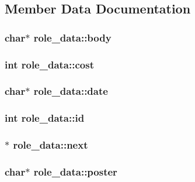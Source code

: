 \subsection{Member Data Documentation}
\hypertarget{structrole__data_a52171559fdafc63e0383f45bd0db9c30}{
\subsubsection[{body}]{\setlength{\rightskip}{0pt plus 5cm}char$\ast$ role\-\_\-data\-::body}}\label{structrole__data_a52171559fdafc63e0383f45bd0db9c30}
\hypertarget{structrole__data_a371b44ddb9a1fa4a8b8d158cc5beaf1e}{
\subsubsection[{cost}]{\setlength{\rightskip}{0pt plus 5cm}int role\-\_\-data\-::cost}}\label{structrole__data_a371b44ddb9a1fa4a8b8d158cc5beaf1e}
\hypertarget{structrole__data_ac2201dc10fb1e79789b5b0a012603b0f}{
\subsubsection[{date}]{\setlength{\rightskip}{0pt plus 5cm}char$\ast$ role\-\_\-data\-::date}}\label{structrole__data_ac2201dc10fb1e79789b5b0a012603b0f}
\hypertarget{structrole__data_a9d9be7e3de7e18725f2ae12f3a9f4b07}{
\subsubsection[{id}]{\setlength{\rightskip}{0pt plus 5cm}int role\-\_\-data\-::id}}\label{structrole__data_a9d9be7e3de7e18725f2ae12f3a9f4b07}
\hypertarget{structrole__data_aa40a5d46afe438d463675aa5bea0a0ac}{
\subsubsection[{next}]{$\ast$ role\-\_\-data\-::next}}\label{structrole__data_aa40a5d46afe438d463675aa5bea0a0ac}
\hypertarget{structrole__data_a1868bd646f4a34f7443a8f2646a8799a}{
\subsubsection[{poster}]{\setlength{\rightskip}{0pt plus 5cm}char$\ast$ role\-\_\-data\-::poster}}\label{structrole__data_a1868bd646f4a34f7443a8f2646a8799a}
